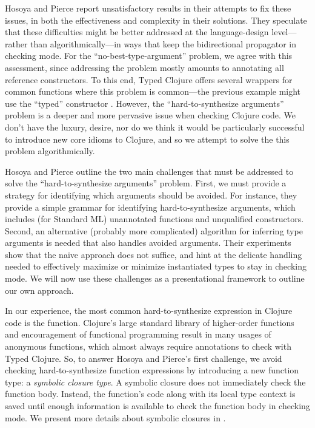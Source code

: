 Hosoya and Pierce report unsatisfactory results in their attempts to
fix these issues, in both the effectiveness and complexity
in their solutions.
They speculate that these difficulties might be better 
addressed at the language-design level---rather than algorithmically---in ways that
keep the bidirectional propagator in checking mode.
For the ``no-best-type-argument'' problem,
we agree with this assessment, since
addressing the problem mostly amounts to annotating 
all reference constructors.
To this end,
Typed Clojure offers several
wrappers for common functions where this problem
is common---the previous example might use the ``typed''
constructor
.
However, the ``hard-to-synthesize arguments'' problem
is a deeper and more pervasive issue when checking Clojure code.
We don't have the luxury, desire, nor do we think it would be particularly
successful to introduce new core idioms to Clojure,
and so we attempt to solve the this problem algorithmically.


Hosoya and Pierce outline the two main challenges that must be
addressed to solve the ``hard-to-synthesize arguments'' problem.
First, we must provide a strategy for identifying which arguments 
should be avoided.
For instance,
they provide a simple grammar for identifying hard-to-synthesize arguments,
which includes (for Standard ML) unannotated functions and unqualified constructors.
Second, an alternative (probably more complicated) algorithm
for inferring type arguments is needed that also handles
avoided arguments.
Their experiments show that the naive approach does not suffice,
and hint at the delicate handling needed to effectively maximize or minimize
instantiated types to stay in checking mode.
We will now use these challenges as a presentational framework to outline our own approach.

In our experience, the most common hard-to-synthesize expression in Clojure code
is the function.
Clojure's large standard library of higher-order functions and encouragement
of functional programming result in many usages of anonymous functions, which almost
always require annotations to check with Typed Clojure.
So, to answer Hosoya and Pierce's first challenge, 
we avoid checking hard-to-synthesize function expressions by
introducing a new function type: a \emph{symbolic closure type}.
A symbolic closure does not immediately check the function body. Instead,
the function's code along with its local type context is saved
until enough information is available to check
the function body in checking mode.
We present more details about symbolic closures in .

